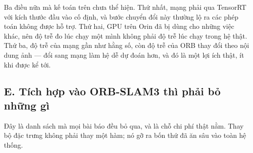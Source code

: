 \documentclass[../../deep_learning.tex]{subfiles}
\begin{document}
Ba điều nữa mà kế toán trên chưa thể hiện. Thứ nhất, mạng phải qua TensorRT với kích thước đầu vào cố định, và bước chuyển đổi này thường lộ ra các phép toán không được hỗ trợ. Thứ hai, GPU trên Orin đã bị dùng cho những việc khác, nên độ trễ đo lúc chạy một mình không phải độ trễ lúc chạy trong hệ thật. Thứ ba, độ trễ của mạng gần như hằng số, còn độ trễ của ORB thay đổi theo nội dung ảnh --- đổi sang mạng làm hệ dễ dự đoán hơn, và đó là một lợi ích thật, ít khi được kể tới.

\subsection{E. Tích hợp vào ORB-SLAM3 thì phải bỏ những gì}
Đây là danh sách mà mọi bài báo đều bỏ qua, và là chỗ chi phí thật nằm. Thay bộ đặc trưng không phải thay một hàm; nó gỡ ra bốn thứ đã ăn sâu vào toàn hệ thống.
\end{document}
